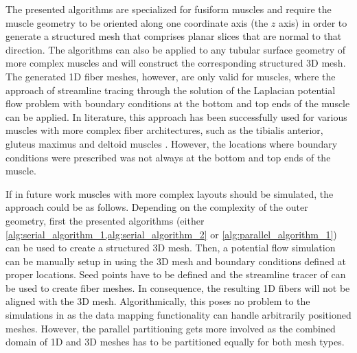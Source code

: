 The presented algorithms are specialized for fusiform muscles and require the muscle geometry to be oriented along one coordinate axis (the $z$ axis) in order to generate a structured mesh  that comprises planar slices that are normal to that direction.
The algorithms can also be applied to any tubular surface geometry of more complex muscles and will construct the corresponding structured 3D mesh. The generated 1D fiber meshes, however, are only valid for muscles, where the approach of streamline tracing through the solution of the Laplacian potential flow problem with boundary conditions at the bottom and top ends of the muscle can be applied.
In literature, this approach has been successfully used for various muscles with more complex fiber architectures, such as the tibialis anterior, gluteus maximus and deltoid muscles \cite{Choi2013}. However, the locations where boundary conditions were prescribed was not always at the bottom and top ends of the muscle.

If in future work muscles with more complex layouts should be simulated, the approach could be as follows. Depending on the complexity of the outer geometry, first the presented algorithms (either \cref{alg:serial_algorithm_1,alg:serial_algorithm_2} or \cref{alg:parallel_algorithm_1}) can be used to create a structured 3D mesh. Then, a potential flow simulation can be manually setup in \opendihu{} using the 3D mesh and boundary conditions defined at proper locations. Seed points have to be defined and the streamline tracer of \opendihu{} can be used to create fiber meshes. In consequence, the resulting 1D fibers will not be aligned with the 3D mesh. Algorithmically, this poses no problem to the simulations in \opendihu{} as the data mapping functionality can handle arbitrarily positioned meshes. However, the parallel partitioning gets more involved as the combined domain of 1D and 3D meshes has to be partitioned equally for both mesh types.

%
